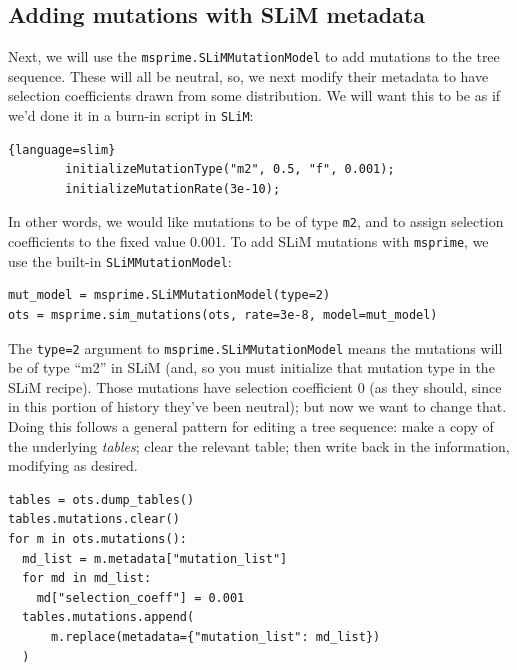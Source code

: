 \documentclass[12pt]{article}
\newcommand{\msprime}[0]{\texttt{msprime}\xspace}
\newcommand{\slim}[0]{\texttt{SLiM}\xspace}
\begin{document}
\subsection*{Adding mutations with SLiM metadata}

Next, we will use the \verb|msprime.SLiMMutationModel| to add mutations to the tree sequence.
These will all be neutral,
so, we next modify their metadata to have selection coefficients drawn from some distribution.
We will want this to be as if we'd done it in a burn-in script in \slim:
\begin{lstlisting}{language=slim}
        initializeMutationType("m2", 0.5, "f", 0.001);
        initializeMutationRate(3e-10);
\end{lstlisting}
In other words, we would like mutations to be of type \verb|m2|,
and to assign selection coefficients to the fixed value 0.001.
To add SLiM mutations with \msprime, we use the built-in
\verb|SLiMMutationModel|:
\begin{listing}[H]
    \begin{verbatim}
mut_model = msprime.SLiMMutationModel(type=2)
ots = msprime.sim_mutations(ots, rate=3e-8, model=mut_model)
  \end{verbatim}
\end{listing}
The \verb|type=2| argument to \verb|msprime.SLiMMutationModel|
means the mutations will be of type ``m2'' in SLiM
(and, so you must initialize that mutation type in the SLiM recipe).
Those mutations have selection coefficient 0
(as they should, since in this portion of history they've been neutral);
but now we want to change that.
Doing this follows a general pattern for editing a tree sequence:
make a copy of the underlying \emph{tables};
clear the relevant table;
then write back in the information, modifying as desired.
\begin{listing}[H]
    \begin{verbatim}
tables = ots.dump_tables()
tables.mutations.clear()
for m in ots.mutations():
  md_list = m.metadata["mutation_list"]
  for md in md_list:
    md["selection_coeff"] = 0.001
  tables.mutations.append(
      m.replace(metadata={"mutation_list": md_list})
  )
  \end{verbatim}
\end{listing}
\end{document}
